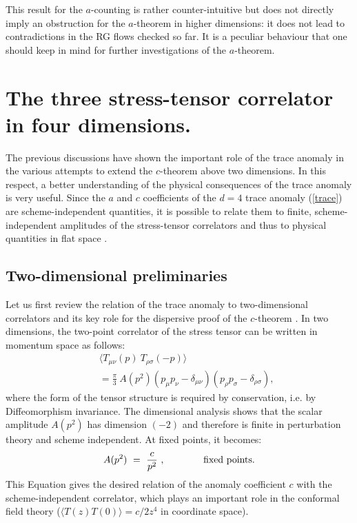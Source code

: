\documentclass[proceedings]{JHEP}
\newcommand{\beq}{\begin{equation}}
\newcommand{\eeq}{\end{equation}}
\newcommand{\bea}{\begin{eqnarray}}
\newcommand{\eea}{\end{eqnarray}}
\def\s{\sigma}
\def\d{\delta}
\def\r{\rho}
\def\nl{\nonumber\\}
\def\bra{\langle}
\def\ket{\rangle}
\begin{document}
This result for the $a$-counting is rather counter-intuitive but does not
directly imply an obstruction for
the $a$-theorem in higher dimensions: it
does not lead to contradictions in the RG flows checked so far.
It is a peculiar behaviour that one should 
keep in mind for further investigations of the $a$-theorem.





\section{The three stress-tensor correlator in four dimensions.}

The previous discussions have shown the important role
of the trace anomaly in the various attempts to
extend the $c$-theorem above two dimensions.
In this respect, 
a better understanding of the physical consequences of the trace
anomaly is very useful.
Since the $a$ and $c$ coefficients of the $d=4$ trace anomaly
(\ref{trace}) are scheme-independent quantities,
it is possible to relate them to finite, 
scheme-inde\-pen\-dent amplitudes of the stress-tensor correlators
and thus to physical quantities in flat space \cite{kaguma}. 


\subsection{Two-dimensional preliminaries}

Let us first review the relation of the trace anomaly to two-dimensional
correlators and its key role for the dispersive proof of the $c$-theorem
\cite{cfl}.
In two dimensions, the two-point correlator of the stress tensor
can be written in momentum space as follows: 
\bea
\!\! &&\bra T_{\mu\nu}(p)\ T_{\r\s}(-p) \ket \nl
\!\! && = \frac{\pi}{3}\ A(p^2)
\left(p_\mu p_\nu - \d_{\mu\nu} \right)
\left(p_\r p_\s - \d_{\r\s} \right) ,
\label{2t2}\eea
where the form of the tensor structure is required by conservation,
i.e. by Diffeomorphism invariance.
The dimensional analysis shows that the scalar
amplitude $A(p^2)$ has dimension $(-2)$ and therefore
is finite in perturbation theory and scheme independent.
At fixed points, it becomes:
\beq
A(p^2) \ =\ \frac{c}{p^2} \ , \qquad\qquad {\rm fixed\ points}.
\label{2d-c}
\eeq
This Equation gives the desired relation of 
the anomaly coefficient $c$ with the scheme-independent
correlator, which plays an important role in the
conformal field theory \cite{id}
($\bra T(z)T(0) \ket=c/2z^4$ in coordinate space).
\end{document}

